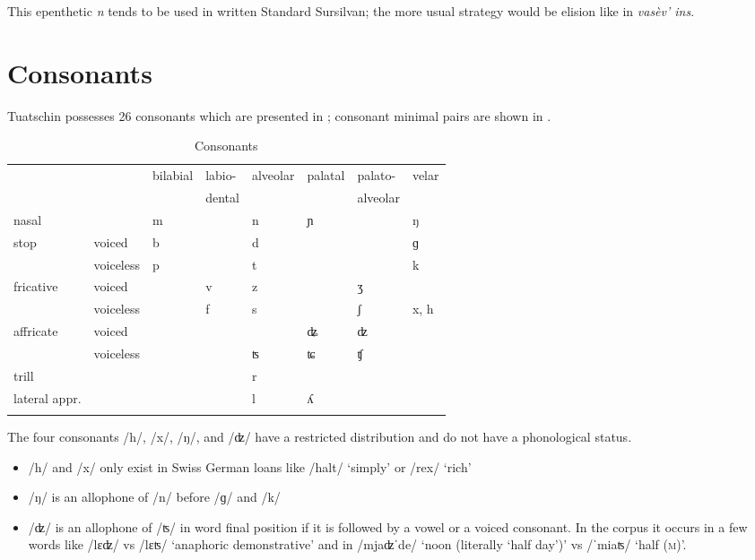 This epenthetic \textit{n} tends to be used in written Standard Sursilvan; the more usual strategy would be elision like in \textit{vasèv' ins}.

 
\section{Consonants}
Tuatschin possesses 26 consonants which are presented in ; consonant minimal pairs are shown in .

\begin{table}
\caption{Consonants}
\label{cons}
 \begin{tabular}{llllllll}
  \lsptoprule
      &  & bilabial & labio-  & alveolar  &  palatal & palato- &velar\\
     &&& dental &&& alveolar \\
  \midrule
nasal    &    &  m   & &  n       &  	ɲ & & ŋ \\

stop &voiced   &  b  &   &  d     &  &  & ɡ\\
  & voiceless   &  p   &      & t  &  & & k\\
fricative  &  voiced  &      & v        & z & &	ʒ\\
  &  voiceless  &      &   f      & s & & ʃ & x, h\\
  affricate & voiced & & & & ʥ &ʣ& \\
  & voiceless &&& ʦ & ʨ & ʧ \\
trill  &    &      &         & r \\
lateral appr.  &    &      &         & l & ʎ \\
  \lspbottomrule
 \end{tabular}
\end{table}

The four consonants /h/, /x/, /ŋ/, and /ʣ/ have a restricted distribution and do not have a phonological status.

\begin{itemize}
	\item /h/ and /x/ only exist in Swiss German loans like  /halt/ `simply' or /rex/ `rich'
	
	\item /ŋ/ is an allophone of /n/ before /ɡ/ and /k/
	
	\item /ʣ/ is an allophone of /ʦ/ in word final position if it is followed by a vowel or a voiced consonant. In the corpus it occurs in a few words like /lɛʣ/ vs /lɛʦ/ `anaphoric demonstrative' and in /mjaʣˈde/ `noon (literally `half day')' vs /ˈmiaʦ/ `half \textsc{(m})'.
\end{itemize}

